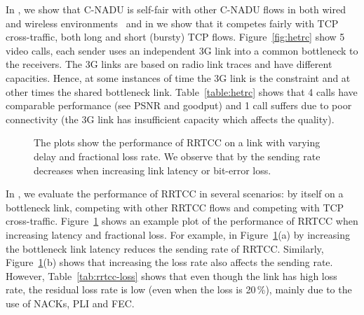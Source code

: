 In , we show that C-NADU is self-fair with other C-NADU flows
in both wired and wireless environments~\cite{singh:2010.thesis} and in
 we show that it competes fairly with TCP cross-traffic, both
long and short (bursty) TCP flows. Figure~\ref{fig:hetrc} show 5 video calls,
each sender uses an independent 3G link into a common bottleneck to the
receivers. The 3G links are based on radio link traces and have different
capacities. Hence, at some instances of time the 3G link is the constraint and
at other times the shared bottleneck link. Table~\ref{table:hetrc} shows that
4 calls have comparable performance (see PSNR and goodput) and 1 call suffers
due to poor connectivity (the 3G link has insufficient capacity which affects
the quality).

\begin{figure}[!t]
  \centerline{
   }
   \centerline{
  }
  \caption{The plots show the performance of RRTCC on a link with varying
  delay and fractional loss rate. We observe that by the sending rate
  decreases when increasing link latency or bit-error loss. }
  \label{fig:rrtcc-single}
\end{figure}

\begin{table}[!t]
\begin{center}{
  }
\end{center}
\caption{RRTCC: Metrics for a bottleneck with different packet loss rates.}
\label{tab:rrtcc-loss}
\end{table}

In , we evaluate the performance of RRTCC in several
scenarios: by itself on a bottleneck link, competing with other RRTCC flows
and competing with TCP cross-traffic. Figure~\ref{fig:rrtcc-single} shows an
example plot of the performance of RRTCC when increasing latency and
fractional loss. For example, in Figure~\ref{fig:rrtcc-single}(a) by
increasing the bottleneck link latency reduces the sending rate of RRTCC.
Similarly, Figure~\ref{fig:rrtcc-single}(b) shows that increasing the loss
rate also affects the sending rate. However, Table~\ref{tab:rrtcc-loss} shows
that even though the link has high loss rate, the residual loss rate is low
(even when the loss is 20\,\%), mainly due to the use of NACKs, PLI and FEC.


